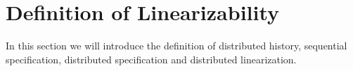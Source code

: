 

\section{Definition of Linearizability}
\label{sec:definition of linearizability}


In this section we will introduce the definition of distributed history, sequential specification, distributed specification and distributed linearization. 

